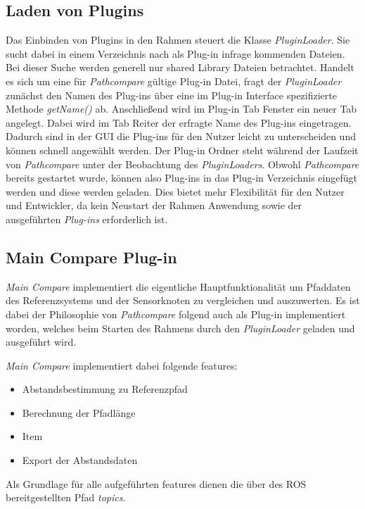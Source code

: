 \subsection{Laden von Plugins}
Das Einbinden von Plugins in den Rahmen steuert die Klasse
\textit{PluginLoader}. Sie sucht dabei in einem Verzeichnis nach als Plug-in
infrage kommenden Dateien. Bei dieser Suche werden generell nur shared Library
Dateien betrachtet. Handelt es sich um eine für \textit{Pathcompare} gültige
Plug-in Datei, fragt der \textit{PluginLoader} zunächst den Namen des Plug-ins
über eine im Plug-in Interface spezifizierte Methode \textit{getName()} ab.
Anschließend wird im Plug-in Tab Fenster ein neuer Tab angelegt. Dabei wird im
Tab Reiter der erfragte Name des Plug-ins eingetragen. Dadurch sind in der GUI die Plug-ins für den
Nutzer leicht zu unterscheiden und können schnell angewählt werden.
Der Plug-in Ordner steht während der Laufzeit von \textit{Pathcompare}
unter der Beobachtung des \textit{PluginLoaders}. 
Obwohl \textit{Pathcompare} bereits gestartet wurde, können also Plug-ins in das Plug-in
Verzeichnis eingefügt werden und diese werden geladen. Dies bietet mehr Flexibilität für den
Nutzer und Entwickler, da kein Neustart der Rahmen Anwendung sowie der ausgeführten
\textit{Plug-ins} erforderlich ist.


\subsection{Main Compare Plug-in}
\label{sub:maincompare}


\textit{Main Compare} implementiert die eigentliche Hauptfunktionalität um Pfaddaten des
Referenzsystems und der Sensorknoten zu vergleichen und auszuwerten. 
Es ist dabei der Philosophie von \textit{Pathcompare} folgend auch als Plug-in
implementiert worden, welches beim Starten des Rahmens durch den
\textit{PluginLoader} geladen und ausgeführt wird.


\textit{Main Compare} implementiert dabei folgende features:

\begin{itemize}
  \item Abstandsbestimmung zu Referenzpfad
  \item Berechnung der Pfadlänge
  \item Item
  \item Export der Abstandsdaten
\end{itemize}

Als Grundlage für alle aufgeführten features dienen die über des ROS
bereitgestellten Pfad \textit{topics}.

